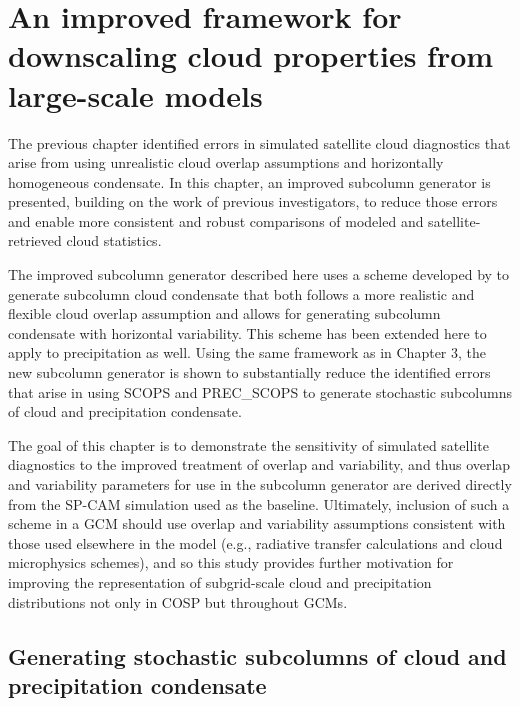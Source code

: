 \chapter{An improved framework for downscaling cloud properties from
large-scale models}\label{sec:subgrid2}

The previous chapter identified errors in simulated satellite cloud
diagnostics that arise from using unrealistic cloud overlap assumptions
and horizontally homogeneous condensate. In this chapter, an improved
subcolumn generator is presented, building on the work of previous
investigators, to reduce those errors and enable more consistent and
robust comparisons of modeled and satellite-retrieved cloud statistics.

The improved subcolumn generator described here uses a scheme developed
by \citet{raisanen_et_al_2004} to generate subcolumn cloud condensate
that both follows a more realistic and flexible cloud overlap assumption
and allows for generating subcolumn condensate with horizontal
variability. This scheme has been extended here to apply to
precipitation as well. Using the same framework as in Chapter 3, the new
subcolumn generator is shown to substantially reduce the identified
errors that arise in using SCOPS and PREC\_SCOPS to generate stochastic
subcolumns of cloud and precipitation condensate.

The goal of this chapter is to demonstrate the sensitivity of simulated
satellite diagnostics to the improved treatment of overlap and
variability, and thus overlap and variability parameters for use in the
subcolumn generator are derived directly from the SP-CAM simulation used
as the baseline. Ultimately, inclusion of such a scheme in a GCM should
use overlap and variability assumptions consistent with those used
elsewhere in the model (e.g., radiative transfer calculations and cloud
microphysics schemes), and so this study provides further motivation for
improving the representation of subgrid-scale cloud and precipitation
distributions not only in COSP but throughout GCMs.

\section{Generating stochastic subcolumns of cloud and precipitation
condensate}\label{sec:subgrid2Generator}

